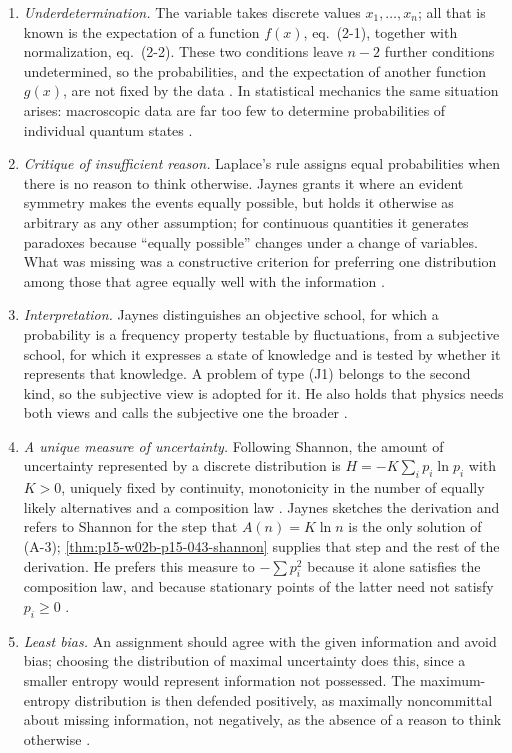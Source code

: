 \begin{enumerate}
\item[(J1)] \emph{Underdetermination.} The variable takes discrete values
\(x_1,\ldots,x_n\); all that is known is the expectation of a function
\(f(x)\), eq.~(2-1), together with normalization, eq.~(2-2). These two
conditions leave \(n-2\) further conditions undetermined, so the probabilities,
and the expectation of another function \(g(x)\), are not fixed by the data
\cite[p.~622]{Jaynes1957InformationTheory}. In statistical mechanics the same
situation arises: macroscopic data are far too few to determine probabilities
of individual quantum states \cite[p.~622, n.~5]{Jaynes1957InformationTheory}.
\item[(J2)] \emph{Critique of insufficient reason.} Laplace's rule assigns
equal probabilities when there is no reason to think otherwise. Jaynes grants
it where an evident symmetry makes the events equally possible, but holds it
otherwise as arbitrary as any other assumption; for continuous quantities it
generates paradoxes because ``equally possible'' changes under a change of
variables. What was missing was a constructive criterion for preferring one
distribution among those that agree equally well with the information
\cite[p.~622]{Jaynes1957InformationTheory}.
\item[(J3)] \emph{Interpretation.} Jaynes distinguishes an objective school,
for which a probability is a frequency property testable by fluctuations,
from a subjective school, for which it expresses a state of knowledge and is
tested by whether it represents that knowledge. A problem of type (J1) belongs
to the second kind, so the subjective view is adopted for it. He also holds
that physics needs both views and calls the subjective one the broader
\cite[p.~622]{Jaynes1957InformationTheory}.
\item[(J4)] \emph{A unique measure of uncertainty.} Following Shannon, the
amount of uncertainty represented by a discrete distribution is
\(H=-K\sum_ip_i\ln p_i\) with \(K>0\), uniquely fixed by continuity,
monotonicity in the number of equally likely alternatives and a composition
law \cite[p.~622, eq.~(2-3); p.~630, eqs.~(A-1)--(A-5)]{Jaynes1957InformationTheory}.
Jaynes sketches the derivation and refers to Shannon for the step that
\(A(n)=K\ln n\) is the only solution of (A-3);
\cref{thm:p15-w02b-p15-043-shannon} supplies that step and the rest of the
derivation. He prefers this measure to \(-\sum p_i^2\) because it alone
satisfies the composition law, and because stationary points of the latter
need not satisfy \(p_i\geq0\) \cite[p.~623]{Jaynes1957InformationTheory}.
\item[(J5)] \emph{Least bias.} An assignment should agree with the given
information and avoid bias; choosing the distribution of maximal uncertainty
does this, since a smaller entropy would represent information not possessed.
The maximum-entropy distribution is then defended positively, as maximally
noncommittal about missing information, not negatively, as the absence of a
reason to think otherwise \cite[pp.~622--623]{Jaynes1957InformationTheory}.
\end{enumerate}

